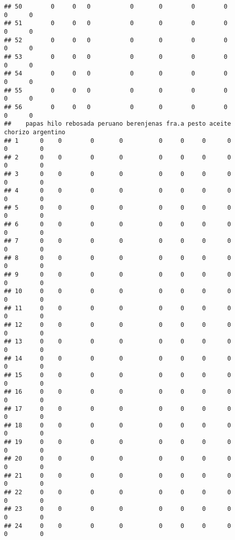 \documentclass[
]{article}
\begin{document}
\begin{verbatim}
## 50        0     0   0           0       0        0        0         0      0
## 51        0     0   0           0       0        0        0         0      0
## 52        0     0   0           0       0        0        0         0      0
## 53        0     0   0           0       0        0        0         0      0
## 54        0     0   0           0       0        0        0         0      0
## 55        0     0   0           0       0        0        0         0      0
## 56        0     0   0           0       0        0        0         0      0
##    papas hilo rebosada peruano berenjenas fra.a pesto aceite chorizo argentino
## 1      0    0        0       0          0     0     0      0       0         0
## 2      0    0        0       0          0     0     0      0       0         0
## 3      0    0        0       0          0     0     0      0       0         0
## 4      0    0        0       0          0     0     0      0       0         0
## 5      0    0        0       0          0     0     0      0       0         0
## 6      0    0        0       0          0     0     0      0       0         0
## 7      0    0        0       0          0     0     0      0       0         0
## 8      0    0        0       0          0     0     0      0       0         0
## 9      0    0        0       0          0     0     0      0       0         0
## 10     0    0        0       0          0     0     0      0       0         0
## 11     0    0        0       0          0     0     0      0       0         0
## 12     0    0        0       0          0     0     0      0       0         0
## 13     0    0        0       0          0     0     0      0       0         0
## 14     0    0        0       0          0     0     0      0       0         0
## 15     0    0        0       0          0     0     0      0       0         0
## 16     0    0        0       0          0     0     0      0       0         0
## 17     0    0        0       0          0     0     0      0       0         0
## 18     0    0        0       0          0     0     0      0       0         0
## 19     0    0        0       0          0     0     0      0       0         0
## 20     0    0        0       0          0     0     0      0       0         0
## 21     0    0        0       0          0     0     0      0       0         0
## 22     0    0        0       0          0     0     0      0       0         0
## 23     0    0        0       0          0     0     0      0       0         0
## 24     0    0        0       0          0     0     0      0       0         0

\end{verbatim}
\end{document}
